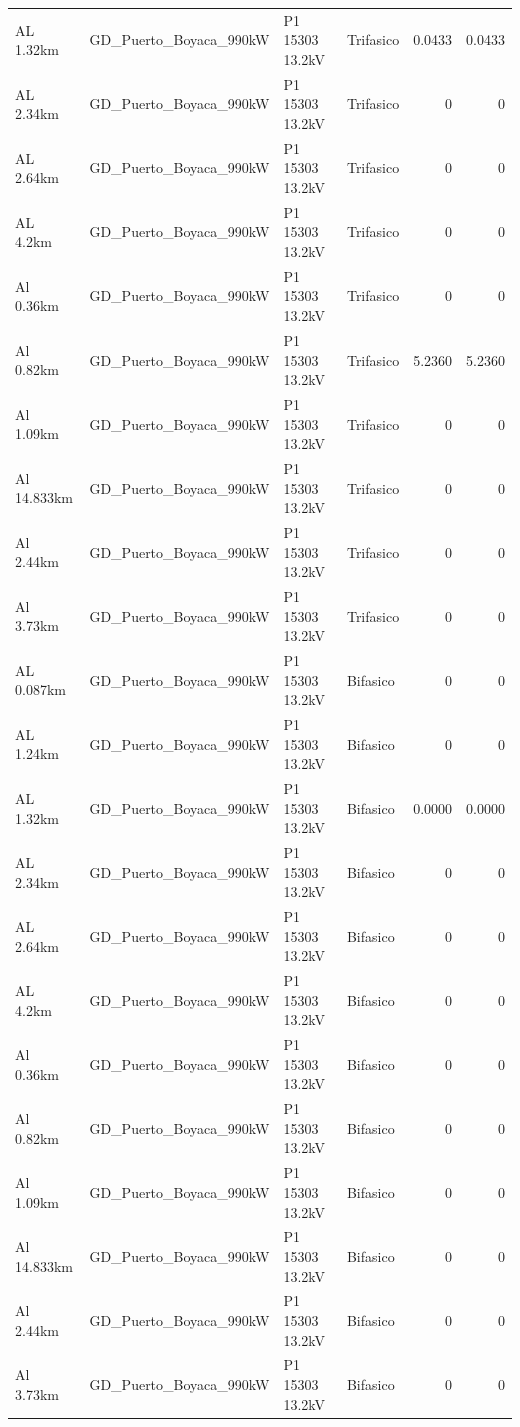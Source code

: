 \documentclass[11pt,a4paper]{article}
\begin{document}
\begin{longtable}{llllrr}
AL 1.32km & GD\_Puerto\_Boyaca\_990kW & P1 15303 13.2kV & Trifasico & 0.0433 & 0.0433 \\
AL 2.34km & GD\_Puerto\_Boyaca\_990kW & P1 15303 13.2kV & Trifasico & 0 & 0 \\
AL 2.64km & GD\_Puerto\_Boyaca\_990kW & P1 15303 13.2kV & Trifasico & 0 & 0 \\
AL 4.2km & GD\_Puerto\_Boyaca\_990kW & P1 15303 13.2kV & Trifasico & 0 & 0 \\
Al 0.36km & GD\_Puerto\_Boyaca\_990kW & P1 15303 13.2kV & Trifasico & 0 & 0 \\
Al 0.82km & GD\_Puerto\_Boyaca\_990kW & P1 15303 13.2kV & Trifasico & 5.2360 & 5.2360 \\
Al 1.09km & GD\_Puerto\_Boyaca\_990kW & P1 15303 13.2kV & Trifasico & 0 & 0 \\
Al 14.833km & GD\_Puerto\_Boyaca\_990kW & P1 15303 13.2kV & Trifasico & 0 & 0 \\
Al 2.44km & GD\_Puerto\_Boyaca\_990kW & P1 15303 13.2kV & Trifasico & 0 & 0 \\
Al 3.73km & GD\_Puerto\_Boyaca\_990kW & P1 15303 13.2kV & Trifasico & 0 & 0 \\
AL 0.087km & GD\_Puerto\_Boyaca\_990kW & P1 15303 13.2kV & Bifasico & 0 & 0 \\
AL 1.24km & GD\_Puerto\_Boyaca\_990kW & P1 15303 13.2kV & Bifasico & 0 & 0 \\
AL 1.32km & GD\_Puerto\_Boyaca\_990kW & P1 15303 13.2kV & Bifasico & 0.0000 & 0.0000 \\
AL 2.34km & GD\_Puerto\_Boyaca\_990kW & P1 15303 13.2kV & Bifasico & 0 & 0 \\
AL 2.64km & GD\_Puerto\_Boyaca\_990kW & P1 15303 13.2kV & Bifasico & 0 & 0 \\
AL 4.2km & GD\_Puerto\_Boyaca\_990kW & P1 15303 13.2kV & Bifasico & 0 & 0 \\
Al 0.36km & GD\_Puerto\_Boyaca\_990kW & P1 15303 13.2kV & Bifasico & 0 & 0 \\
Al 0.82km & GD\_Puerto\_Boyaca\_990kW & P1 15303 13.2kV & Bifasico & 0 & 0 \\
Al 1.09km & GD\_Puerto\_Boyaca\_990kW & P1 15303 13.2kV & Bifasico & 0 & 0 \\
Al 14.833km & GD\_Puerto\_Boyaca\_990kW & P1 15303 13.2kV & Bifasico & 0 & 0 \\
Al 2.44km & GD\_Puerto\_Boyaca\_990kW & P1 15303 13.2kV & Bifasico & 0 & 0 \\
Al 3.73km & GD\_Puerto\_Boyaca\_990kW & P1 15303 13.2kV & Bifasico & 0 & 0 \\

\end{longtable}
\end{document}
